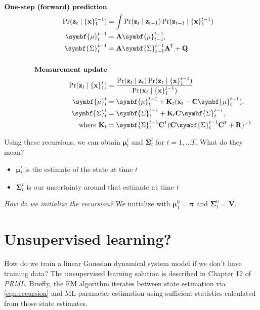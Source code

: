\documentclass[11pt]{article}
\newcommand{\xb}{\mathbf{x}}
\newcommand{\zb}{\mathbf{z}}
\newcommand{\ub}{\symbf{\mu}}
\newcommand{\Sb}{\symbf{\Sigma}}
\newcommand{\Ab}{\mathbf{A}}
\newcommand{\Qb}{\mathbf{Q}}
\newcommand{\Cb}{\mathbf{C}}
\newcommand{\Rb}{\mathbf{R}}
\newcommand*{\tran}{^{\mkern-1.5mu\mathsf{T}}}
\begin{document}
\begin{equation}
\begin{aligned}
  \textbf{One-step (forward) prediction} \\
  \Pr(\zb_t \mid \{\xb\}_1^{t-1}) &= \int
  \Pr(\zb_t \mid \zb_{t-1})
  \Pr(\zb_{t-1} \mid \{\xb\}_1^{t-1}) \\
  \ub_t^{t-1} &= \Ab \ub_{t-1}^{t-1}, \\
  \Sb_t^{t-1} &= \Ab \Sb_{t-1}^{t-1} \Ab\tran + \Qb \\
  \\
  \textbf{Measurement update} \\
  \Pr(\zb_t \mid \{\xb\}_1^t) &= \frac{\Pr(\zb_t \mid \zb_t)
    \Pr(\zb_t \mid \{\xb\}_1^{t-1})}
  {\Pr(\xb_t \mid \{\xb\}_1^{t-1})} \\
  \ub_t^t &= \ub_t^{t-1} + \mathbf{K}_t (\xb_t - \Cb \ub_t^{t-1}),\\
  \Sb_t^t &= \Sb_t^{t-1} + \mathbf{K}_t \Cb \Sb_t^{t-1}, \\
  \text{where } \mathbf{K}_t &= \Sb_t^{t-1} \Cb\tran (\Cb \Sb_t^{t-1} \Cb\tran + \Rb)^{-1}  \\
\end{aligned}
\label{eqn:recursion}
\end{equation}

Using these recursions, we can obtain $\ub_t^t$ and $\Sb_t^t$ for $t = 1, \ldots
T$. What do they mean?
\begin{itemize}
  \item $\ub_t^t$ is the estimate of the state at time $t$
  \item $\Sb_t^t$ is our uncertainty around that estimate at time $t$
\end{itemize}

\textit{How do we initialize the recursion?} We initialize with $\ub_1^0 =
\symbf{\pi}$ and $\Sb_1^0 = \mathbf{V}$.

\section{Unsupervised learning?}
How do we train a linear Gaussian dynamical system model if we don't have
training data? The unsupervised learning solution is described in Chapter 12 of
\textit{PRML}. Briefly, the EM algorithm iterates between state estimation via
\eqref{eqn:recursion} and ML parameter estimation using sufficient statistics
calculated from those state estimates.
\end{document}
